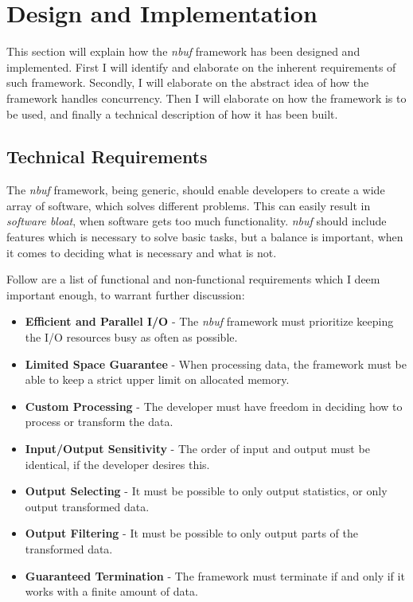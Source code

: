 \documentclass[a4paper]{article}
\newcommand{\nbuf}{\textit{nbuf} }
\begin{document}
\newpage
\section{Design and Implementation}
This section will explain how the \nbuf framework has been designed and implemented. First I will identify and elaborate on the inherent requirements of such framework. Secondly, I will elaborate on the abstract idea of how the framework handles concurrency. Then I will elaborate on how the framework is to be used, and finally a technical description of how it has been built.


\subsection{Technical Requirements}
The \nbuf framework, being generic, should enable developers to create a wide array of software, which solves different problems. This can easily result in \textit{software bloat}, when software gets too much functionality. \nbuf should include features which is necessary to solve basic tasks, but a balance is important, when it comes to deciding what is necessary and what is not.

Follow are a list of functional and non-functional requirements which I deem important enough, to warrant further discussion:

\begin{itemize}
\item \textbf{Efficient and Parallel I/O} - The \nbuf framework must prioritize keeping the I/O resources busy as often as possible.
\item \textbf{Limited Space Guarantee} - When processing data, the framework must be able to keep a strict upper limit on allocated memory.
\item \textbf{Custom Processing} - The developer must have freedom in deciding how to process or transform the data.
\item \textbf{Input/Output Sensitivity} - The order of input and output must be identical, if the developer desires this.
\item \textbf{Output Selecting} - It must be possible to only output statistics, or only output transformed data.
\item \textbf{Output Filtering} - It must be possible to only output parts of the transformed data.
\item \textbf{Guaranteed Termination} - The framework must terminate if and only if it works with a finite amount of data.
\end{itemize}
\end{document}
